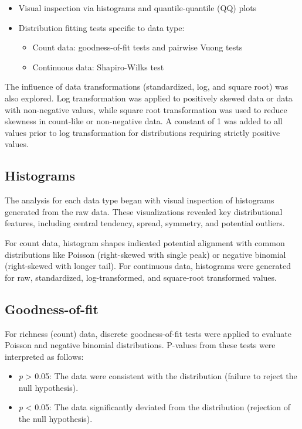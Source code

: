 \documentclass[
  letterpaper,
  DIV=11,
  numbers=noendperiod]{scrartcl}
\providecommand{\tightlist}{%
  \setlength{\itemsep}{0pt}\setlength{\parskip}{0pt}}\usepackage{longtable,booktabs,array}
\begin{document}
\begin{itemize}
\item
  Visual inspection via histograms and quantile-quantile (QQ) plots
\item
  Distribution fitting tests specific to data type:

  \begin{itemize}
  \item
    Count data: goodness-of-fit tests and pairwise Vuong tests
  \item
    Continuous data: Shapiro-Wilks test
  \end{itemize}
\end{itemize}

The influence of data transformations (standardized, log, and square
root) was also explored. Log transformation was applied to positively
skewed data or data with non-negative values, while square root
transformation was used to reduce skewness in count-like or non-negative
data. A constant of 1 was added to all values prior to log
transformation for distributions requiring strictly positive values.

\subsection{Histograms}\label{histograms}

The analysis for each data type began with visual inspection of
histograms generated from the raw data. These visualizations revealed
key distributional features, including central tendency, spread,
symmetry, and potential outliers.

For count data, histogram shapes indicated potential alignment with
common distributions like Poisson (right-skewed with single peak) or
negative binomial (right-skewed with longer tail). For continuous data,
histograms were generated for raw, standardized, log-transformed, and
square-root transformed values.

\subsection{Goodness-of-fit}\label{goodness-of-fit}

For richness (count) data, discrete goodness-of-fit tests were applied
to evaluate Poisson and negative binomial distributions. P-values from
these tests were interpreted as follows:

\begin{itemize}
\tightlist
\item
  \emph{p} \textgreater{} 0.05: The data were consistent with the
  distribution (failure to reject the null hypothesis).
\item
  \emph{p} \textless{} 0.05: The data significantly deviated from the
  distribution (rejection of the null hypothesis).
\end{itemize}
\end{document}
